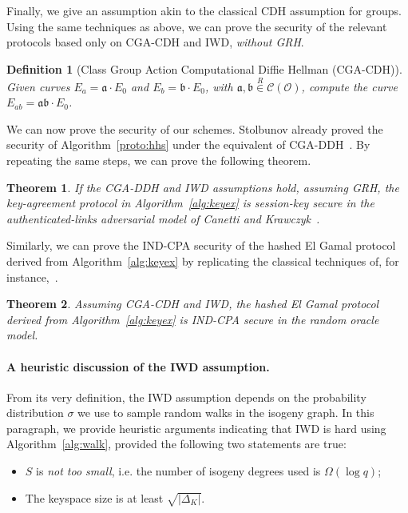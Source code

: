 \documentclass{article}
\newcommand{\Cl}{\mathcal{C}}
\renewcommand{\O}{\mathcal{O}}
\renewcommand{\frak}{\mathfrak}
\newcommand{\rand}[1]{\overset{#1}{∈}}
\newcommand{\uni}{\rand{R}}
\newtheorem{theorem}{Theorem}[section]
\newtheorem{definition}{Definition}[section]
\theoremstyle{definition}
\begin{document}
Finally, we give an assumption akin to the classical CDH assumption
for groups. Using the same techniques as above, we can prove the
security of the relevant protocols based only on CGA-CDH and IWD,
\emph{without GRH}.

\begin{definition}[Class Group Action Computational Diffie Hellman (CGA-CDH)]
  Given curves $E_a=\frak a·E_0$ and $E_b=\frak b·E_0$, with
  $\frak a,\frak b\uni\Cl(\O)$, compute the curve
  $E_{ab}=\frak{ab}·E_0$.
\end{definition}

We can now prove the security of our schemes. Stolbunov already proved
the security of Algorithm~\ref{proto:hhs} under the equivalent of
CGA-DDH~\cite{Stol}. By repeating the same steps, we can prove the
following theorem.

\begin{theorem}
  If the CGA-DDH and IWD assumptions hold, assuming GRH, the
  key-agreement protocol in Algorithm~\ref{alg:keyex} is session-key
  secure in the authenticated-links adversarial model of Canetti and
  Krawczyk~\cite{canetti}.
\end{theorem}

Similarly, we can prove the IND-CPA security of the hashed El Gamal
protocol derived from Algorithm~\ref{alg:keyex} by replicating the
classical techniques of, for
instance,~\cite[20.4.11]{galbraith2012mathematics}.

\begin{theorem}
  Assuming CGA-CDH and IWD, the hashed El Gamal protocol derived from
  Algorithm~\ref{alg:keyex} is IND-CPA secure in the random oracle
  model.
\end{theorem}


\paragraph{A heuristic discussion of the IWD assumption.}

From its very definition, the IWD assumption depends on
the probability distribution $\sigma$ we use to sample
random walks in the isogeny graph. In this paragraph,
we provide heuristic arguments indicating that IWD is hard
using Algorithm~\ref{alg:walk}, provided the following
two statements are true:
\begin{itemize}
\item $S$ is \emph{not too small}, i.e. the number of
isogeny degrees used is $\Omega(\log q)$;
\item The keyspace size is at least $\sqrt{|\Delta_K|}$.
\end{itemize}
\end{document}
